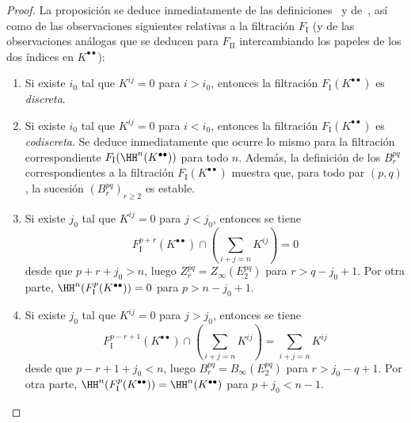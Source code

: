 \documentclass[oneside]{amsart}
\renewcommand{\geq}{\geqslant}
\newcommand{\oldpage}[2][]{{\marginnote{\normalfont\textbf{#1}~|~#2}}\ignorespaces}
\begin{document}
\begin{proof}
La proposición se deduce inmediatamente de las definiciones~ y de~, así como de las observaciones siguientes relativas a la filtración $F_\mathrm{I}$ (y de las observaciones análogas que se deducen para $F_\mathrm{II}$ intercambiando los papeles de los dos índices en $K^{\bullet\bullet}$):
\begin{enumerate}
  \item[{$1^{\circ}$}] Si existe $i_0$ tal que $K^{ij}=0$ para $i>i_0$, entonces la filtración $F_\mathrm{I}(K^{\bullet\bullet})$ es \emph{discreta}.
  \item[{$2^{\circ}$}] Si existe $i_0$ tal que $K^{ij}=0$ para $i<i_0$, entonces la filtración $F_\mathrm{I}(K^{\bullet\bullet})$ es \emph{codiscreta}.
    Se deduce inmediatamente que ocurre lo mismo para la filtración correspondiente $F_\mathrm{I}(\HH^n(K^{\bullet\bullet}))$ para todo $n$.
    Además, la definición de los $B_{r}^{pq}$ correspondientes a la filtración $F_\mathrm{I}(K^{\bullet\bullet})$  muestra que, para todo par $(p,q)$, la sucesión $(B_{r}^{pq})_{r\geq 2}$ es estable.
  \item[{$3^{\circ}$}] Si existe $j_0$ tal que $K^{ij}=0$ para $j<j_0$, entonces se tiene
    \[
      F_\mathrm{I}^{p+r}(K^{\bullet\bullet})
      \cap (\sum_{i+j=n}K^{ij})
      = 0
    \]
    desde que $p+r+j_{0}>n$, luego $Z_{r}^{pq} = Z_\infty(E_2^{pq})$ para $r>q-j_{0}+1$.
    Por otra parte, $\HH^{n}(F_\mathrm{I}^{p}(K^{\bullet\bullet})) = 0$ para $p>n-j_{0}+1$.
  \item[{$4^{\circ}$}] Si existe $j_0$ tal que $K^{ij}=0$ para $j>j_0$, entonces se tiene
    \[
      F_\mathrm{I}^{p-r+1}(K^{\bullet\bullet})
      \cap (\sum_{i+j=n}K^{ij})
      = \sum_{i+j=n}K^{ij}
    \]
    \oldpage[0\textsubscript{III}]{31}
    desde que $p-r+1+j_{0}<n$, luego $B_{r}^{pq} = B_\infty(E_2^{pq})$ para $r>j_{0}-q+1$.
    Por otra parte, $\HH^{n}(F_\mathrm{I}^{p}(K^{\bullet\bullet})) = \HH^{n}(K^{\bullet\bullet})$ para $p+j_{0}<n-1$.
\end{enumerate}
\end{proof}
\end{document}
